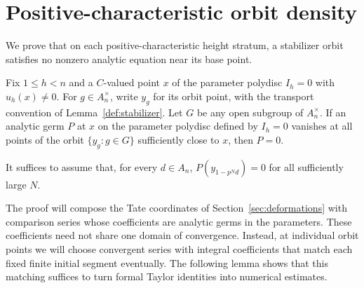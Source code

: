 \section{Positive-characteristic orbit density}\label{sec:orbits}

We prove that on each positive-characteristic height stratum, a stabilizer
orbit satisfies no nonzero analytic equation near its base point.

\begin{theorem}\label{orb:density}
Fix $1\leq h<n$ and a $C$-valued point $x$ of the parameter polydisc
$I_h=0$ with $u_h(x)\neq0$.
For $g\in A_n^\times$, write $y_g$ for its orbit point, with the
transport convention of Lemma~\ref{def:stabilizer}.
Let $G$ be any open subgroup of $A_n^\times$.  If an analytic germ $P$
at $x$ on the parameter polydisc defined by $I_h=0$ vanishes at all
points of the orbit $\{y_g:g\in G\}$ sufficiently close to $x$, then
$P=0$.

It suffices to assume that, for every $d\in A_n$,
$P(y_{1-p^Nd})=0$ for all sufficiently large $N$.
\end{theorem}

The proof will compose the Tate coordinates of
Section~\ref{sec:deformations} with comparison series whose coefficients
are analytic germs in the parameters.  These coefficients need not share
one domain of convergence.  Instead, at individual orbit points we will
choose convergent series with integral coefficients that match each
fixed finite initial segment eventually.  The following lemma shows
that this matching suffices to turn formal Taylor identities into
numerical estimates.

